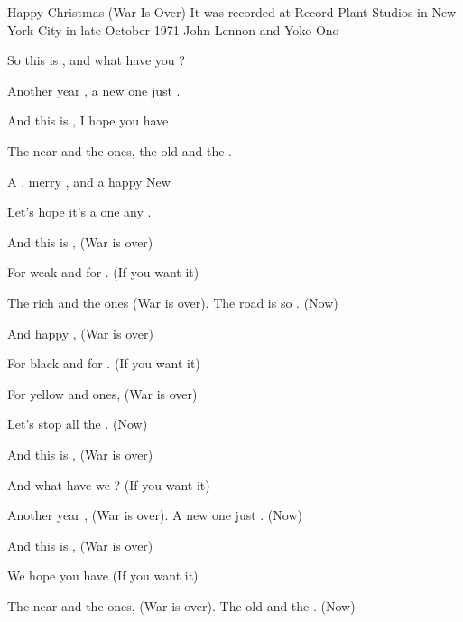 \begin{SBSong}{Happy Christmas (War Is Over)}
    {It was recorded at Record Plant Studios in New York City in late October 1971}
    {John Lennon and Yoko Ono}
  \begin{SBVerse}
	So this is , and what have you ?
	
	Another year , a new one just .
	
	And  this is , I hope you have 
	
	The near and the  ones, the old and the .
  \end{SBVerse}
  \begin{SBChorus}
	A , merry , and a happy New 
	
	Let's hope it's a  one  any . 
  \end{SBChorus}
  \begin{SBVerse}
	And  this is , (War is over)
	
	For weak and for . (If you want it)
	
	The rich and the  ones (War is over). The road is so . (Now)
	
	And  happy , (War is over)
	
	For black and for . (If you want it)
	
	For yellow and  ones, (War is over)
	
	Let's stop all the . (Now)
  \end{SBVerse}
  \begin{SBVerse}
	And  this is , (War is over)
	
	And what have we ? (If you want it)
	
	Another year , (War is over). A new one just . (Now)
	
	And  this is , (War is over)
	
	We hope you have  (If you want it)
	
	The near and the  ones, (War is over). The old and the . (Now)
  \end{SBVerse}
\end{SBSong}
